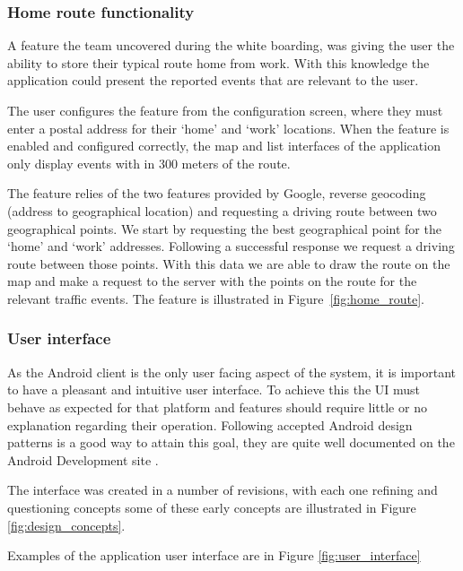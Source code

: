 \subsubsection{Home route functionality}
A feature the team uncovered during the white boarding, was giving the user the
ability to store their typical route home from work. With this knowledge the
application could present the reported events that are relevant to the user.

The user configures the feature from the configuration screen, where they must
enter a postal address for their ‘home’ and ‘work’ locations. When the feature
is enabled and configured correctly, the map and list interfaces of the
application only display events with in 300 meters of the route.

The feature relies of the two features provided by Google, reverse geocoding
(address to geographical location) and requesting a driving route between two
geographical points. We start by requesting the best geographical point for the
‘home’ and ‘work’ addresses. Following a successful response we request a
driving route between those points. With this data we are able to draw the
route on the map and make a request to the server with the points on the route
for the relevant traffic events. The feature is illustrated in Figure~\ref{fig:home_route}.

\subsubsection{User interface}

As the Android client is the only user facing aspect of the system, it is
important to have a pleasant and intuitive user interface. To achieve this the
UI must behave as expected for that platform and features should require little
or no explanation regarding their operation. Following accepted Android design
patterns is a good way to attain this goal, they are quite well documented on
the Android Development site \cite{website:android_ui}.

The interface was created in a number of revisions, with each one refining and
questioning concepts some of these early concepts are illustrated in Figure
\ref{fig:design_concepts}.

Examples of the application user interface are in Figure
\ref{fig:user_interface}
